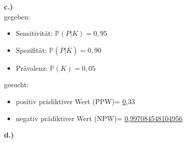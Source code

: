 \documentclass[13pt,a4paper]{article}
\begin{document}
\textbf{c.)}
\\
gegeben:
\begin{itemize}
	\item Sensitivität: $\mathbb{P}(P|K)=0,95$
	\item Spezifität: $\mathbb{P}(\overline{P}|\overline{K})=0,90$
	\item Prävalenz: $\mathbb{P}(K)=0,05$
\end{itemize}

gesucht:\\
\begin{itemize}
	\item positiv prädiktiver Wert (PPW)= \underline{\underline{0,$\overline{33}$}}
	\item negativ prädiktiver Wert (NPW)= \underline{\underline{0,997084548104956}}
\end{itemize}

\textbf{d.)}
\end{document}
